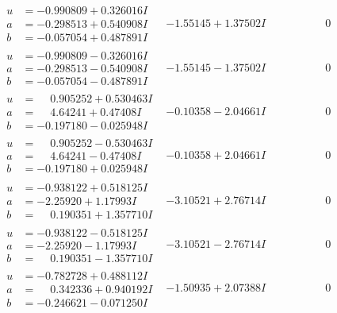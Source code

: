 \documentclass[1p]{elsarticle_modified}
\theoremstyle{definition}
\begin{document}
$$\begin{array}{c|c|c}
\begin{aligned}
u &= -0.990809 + 0.326016 I \\
a &= -0.298513 + 0.540908 I \\
b &= -0.057054 + 0.487891 I\end{aligned}
 & -1.55145 + 1.37502 I & \phantom{-0.000000 } 0 \\ \hline\begin{aligned}
u &= -0.990809 - 0.326016 I \\
a &= -0.298513 - 0.540908 I \\
b &= -0.057054 - 0.487891 I\end{aligned}
 & -1.55145 - 1.37502 I & \phantom{-0.000000 } 0 \\ \hline\begin{aligned}
u &= \phantom{-}0.905252 + 0.530463 I \\
a &= \phantom{-}4.64241 + 0.47408 I \\
b &= -0.197180 - 0.025948 I\end{aligned}
 & -0.10358 - 2.04661 I & \phantom{-0.000000 } 0 \\ \hline\begin{aligned}
u &= \phantom{-}0.905252 - 0.530463 I \\
a &= \phantom{-}4.64241 - 0.47408 I \\
b &= -0.197180 + 0.025948 I\end{aligned}
 & -0.10358 + 2.04661 I & \phantom{-0.000000 } 0 \\ \hline\begin{aligned}
u &= -0.938122 + 0.518125 I \\
a &= -2.25920 + 1.17993 I \\
b &= \phantom{-}0.190351 + 1.357710 I\end{aligned}
 & -3.10521 + 2.76714 I & \phantom{-0.000000 } 0 \\ \hline\begin{aligned}
u &= -0.938122 - 0.518125 I \\
a &= -2.25920 - 1.17993 I \\
b &= \phantom{-}0.190351 - 1.357710 I\end{aligned}
 & -3.10521 - 2.76714 I & \phantom{-0.000000 } 0 \\ \hline\begin{aligned}
u &= -0.782728 + 0.488112 I \\
a &= \phantom{-}0.342336 + 0.940192 I \\
b &= -0.246621 - 0.071250 I\end{aligned}
 & -1.50935 + 2.07388 I & \phantom{-0.000000 } 0 \\ \hline\begin{aligned}

\end{aligned}
\end{array}$$
\end{document}
